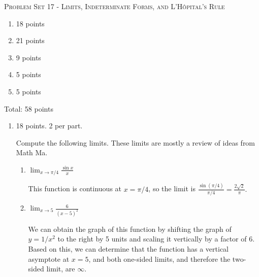 \documentclass{article}
\begin{document}
\begin{center}
  \large\textsc{Problem Set 17 - Limits, Indeterminate Forms, and L'H\^opital's Rule}
\end{center}

\begin{grading}
\begin{enumerate}
    \item 18 points
    \item 21 points
    \item 9 points
    \item 5 points
    \item 5 points

    
\end{enumerate}
Total: 58 points
\end{grading}

\begin{enumerate}
\item 

\begin{grading}
18 points. 2 per part.
\end{grading}

 Compute the following limits. These limits are mostly a review of ideas
 from Math Ma.

  \probonly{}
    \begin{enumerate}
    \item
      \begin{problem}[\vfill]
        $\displaystyle \lim_{x \to \pi/4} \frac{\sin x}{x}$
      \end{problem}

      \begin{solution}
        This function is continuous at $x=\pi/4$, so the limit is 
        $\boxed{\frac{\sin(\pi/4)}{\pi/4} = \frac{2\sqrt{2}}{\pi}.}$
      \end{solution}

    \item
      \begin{problem}[\vfill]
        $\displaystyle \lim_{x \to 5} \frac{6}{(x-5)^2}$
      \end{problem}

      \begin{solution}
        We can obtain the graph of this function by shifting the graph of
        $y=1/x^2$ to the right by 5 units and scaling it vertically by a
        factor of 6. Based on this, we can determine that 
        the function has a vertical asymptote at $x=5$, and both one-sided
        limits, and therefore the two-sided limit, are $\boxed{\infty.}$
      \end{solution}


\end{enumerate}
\end{enumerate}
\end{document}
